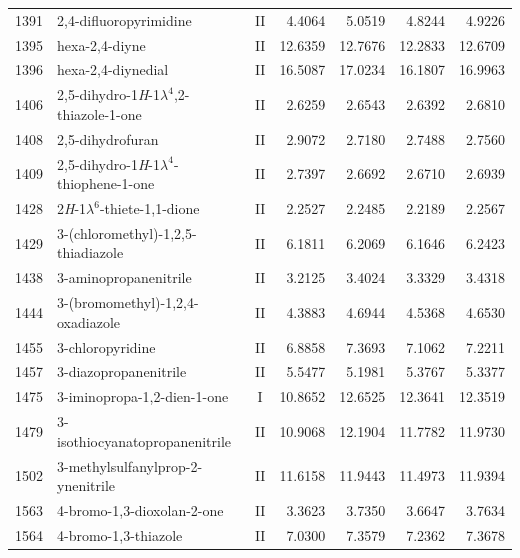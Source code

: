 \begin{longtable}{rlcd{2.5}d{2.5}d{2.5}d{2.5}}
    1391 & 2,4-difluoropyrimidine                                 & II & 4.4064  & 5.0519  & 4.8244  & 4.9226  \\
    1395 & hexa-2,4-diyne                                         & II & 12.6359 & 12.7676 & 12.2833 & 12.6709 \\
    1396 & hexa-2,4-diynedial                                     & II & 16.5087 & 17.0234 & 16.1807 & 16.9963 \\
    1406 & 2,5-dihydro-1\textit{H}-1$\lambda^4$,2-thiazole-1-one  & II & 2.6259  & 2.6543  & 2.6392  & 2.6810  \\
    1408 & 2,5-dihydrofuran                                       & II & 2.9072  & 2.7180  & 2.7488  & 2.7560  \\
    1409 & 2,5-dihydro-1\textit{H}-1$\lambda^4$-thiophene-1-one   & II & 2.7397  & 2.6692  & 2.6710  & 2.6939  \\
    1428 & 2\textit{H}-1$\lambda^6$-thiete-1,1-dione              & II & 2.2527  & 2.2485  & 2.2189  & 2.2567  \\
    1429 & 3-(chloromethyl)-1,2,5-thiadiazole                     & II & 6.1811  & 6.2069  & 6.1646  & 6.2423  \\
    1438 & 3-aminopropanenitrile                                  & II & 3.2125  & 3.4024  & 3.3329  & 3.4318  \\
    1444 & 3-(bromomethyl)-1,2,4-oxadiazole                       & II & 4.3883  & 4.6944  & 4.5368  & 4.6530  \\
    1455 & 3-chloropyridine                                       & II & 6.8858  & 7.3693  & 7.1062  & 7.2211  \\
    1457 & 3-diazopropanenitrile                                  & II & 5.5477  & 5.1981  & 5.3767  & 5.3377  \\
    1475 & 3-iminopropa-1,2-dien-1-one                            & I  & 10.8652 & 12.6525 & 12.3641 & 12.3519 \\
    1479 & 3-isothiocyanatopropanenitrile                         & II & 10.9068 & 12.1904 & 11.7782 & 11.9730 \\
    1502 & 3-methylsulfanylprop-2-ynenitrile                      & II & 11.6158 & 11.9443 & 11.4973 & 11.9394 \\
    1563 & 4-bromo-1,3-dioxolan-2-one                             & II & 3.3623  & 3.7350  & 3.6647  & 3.7634  \\
    1564 & 4-bromo-1,3-thiazole                                   & II & 7.0300  & 7.3579  & 7.2362  & 7.3678  \\

\end{longtable}
